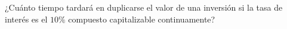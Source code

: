 \item ¿Cuánto tiempo tardará en duplicarse el valor de una inversión si la tasa de interés es el $10\%$ compuesto capitalizable continuamente?
